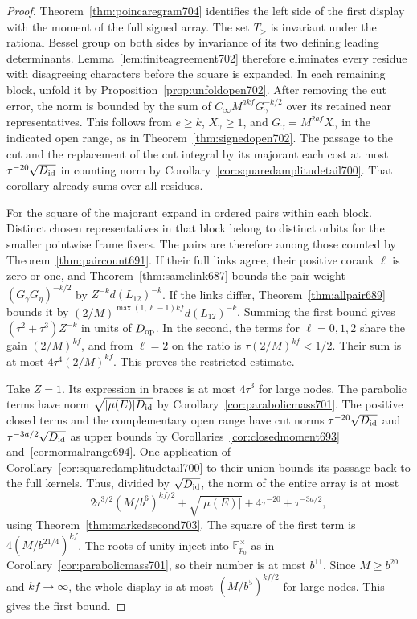 \documentclass[a4paper,11pt]{article}
\theoremstyle{definition}
\theoremstyle{remark}
\numberwithin{equation}{section}
\begin{document}
\begin{proof}
Theorem~\ref{thm:poincaregram704} identifies the left side
of the first display with the moment of the full signed
array. The set \(T_>\) is invariant under the rational Bessel
group on both sides by invariance of its two defining leading
determinants. Lemma~\ref{lem:finiteagreement702} therefore
eliminates every residue with disagreeing characters before
the square is expanded. In each remaining block, unfold it
by Proposition~\ref{prop:unfoldopen702}. After removing the
cut error, the norm is bounded by the sum of
\(C_\infty M^{akf}G_\gamma^{-k/2}\) over its retained near
representatives. This follows from \(e\ge k\), \(X_\gamma\ge1\),
and \(G_\gamma=M^{2af}X_\gamma\) in the indicated open
range, as in Theorem~\ref{thm:signedopen702}. The passage
to the cut and the replacement of the cut integral by its
majorant each cost at most \(\tau^{-20}\sqrt{D_{\rm id}}\)
in counting norm by Corollary~\ref{cor:squaredamplitudetail700}.
That corollary already sums over all residues.

For the square of the majorant expand in ordered pairs
within each block. Distinct chosen representatives in that
block belong to distinct orbits for the smaller pointwise
frame fixers. The pairs are therefore among those counted
by Theorem~\ref{thm:paircount691}. If their full links agree,
their positive corank \(\ell\) is zero or one, and
Theorem~\ref{thm:samelink687} bounds the pair weight
\((G_\gamma G_\eta)^{-k/2}\) by
\(Z^{-k}d(L_{12})^{-k}\).
If the links differ, Theorem~\ref{thm:allpair689} bounds
it by \((2/M)^{\max(1,\ell-1)kf}d(L_{12})^{-k}\).
Summing the first bound gives \((\tau^2+\tau^3)Z^{-k}\)
in units of \(D_{\rm op}\). In the second, the terms for
\(\ell=0,1,2\) share the gain \((2/M)^{kf}\), and from
\(\ell=2\) on the ratio is \(\tau(2/M)^{kf}<1/2\).
Their sum is at most \(4\tau^4(2/M)^{kf}\). This proves
the restricted estimate.

Take \(Z=1\). Its expression in braces is at most \(4\tau^3\)
for large nodes. The parabolic terms have norm
\(\sqrt{|\mu(E)|D_{\rm id}}\) by
Corollary~\ref{cor:parabolicmass701}. The positive closed
terms and the complementary open range have cut norms
\(\tau^{-20}\sqrt{D_{\rm id}}\) and
\(\tau^{-3a/2}\sqrt{D_{\rm id}}\) as upper bounds by
Corollaries~\ref{cor:closedmoment693} and~\ref{cor:normalrange694}.
One application of Corollary~\ref{cor:squaredamplitudetail700}
to their union bounds its passage back to the full kernels.
Thus, divided by \(\sqrt{D_{\rm id}}\), the norm of the entire
array is at most
\[
  2\tau^{3/2}(M/b^6)^{kf/2}
        +\sqrt{|\mu(E)|}+4\tau^{-20}+\tau^{-3a/2},
\]
using Theorem~\ref{thm:markedsecond703}. The square of the
first term is \(4(M/b^{21/4})^{kf}\). The roots of unity
inject into \(\mathbb F_{p_0}^\times\) as in
Corollary~\ref{cor:parabolicmass701}, so their number is
at most \(b^{11}\). Since \(M\ge b^{20}\) and \(kf\to\infty\),
the whole display is at most \((M/b^5)^{kf/2}\) for large
nodes. This gives the first bound.
\end{proof}
\end{document}
